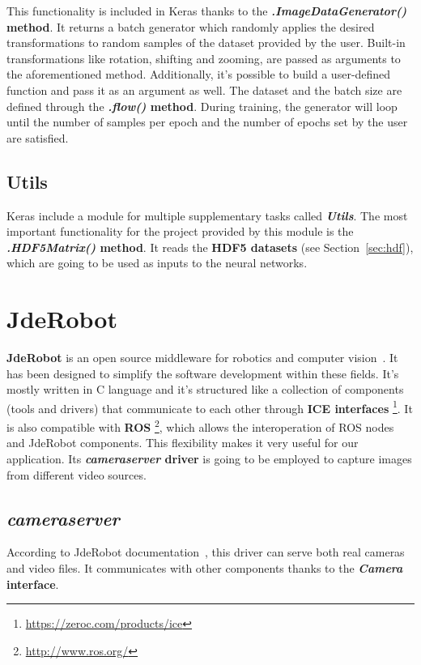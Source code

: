 This functionality is included in Keras thanks to the \textbf{\textit{.ImageDataGenerator()} method}. It returns a batch generator which randomly applies the desired transformations to random samples of the dataset provided by the user. Built-in transformations like rotation, shifting and zooming, are passed as arguments to the aforementioned method. Additionally, it's possible to build a user-defined function and pass it as an argument as well. The dataset and the batch size are defined through the \textbf{\textit{.flow()} method}. During training, the generator will loop until the number of samples per epoch and the number of epochs set by the user are satisfied.

\subsection{Utils}
Keras include a module for multiple supplementary tasks called \textbf{\textit{Utils}}. The most important functionality for the project provided by this module is the \textbf{\textit{.HDF5Matrix()} method}. It reads the \textbf{HDF5 datasets} (see Section~\ref{sec:hdf}), which are going to be used as inputs to the neural networks.

\section{JdeRobot}\label{sec:jderobot}
\textbf{JdeRobot} is an open source middleware for robotics and computer vision~\cite{jderobot}. It has been designed to simplify the software development within these fields. It's mostly written in C\nolinebreak[4]\hspace{-.05em}\raisebox{.4ex}{\tiny\bf ++} language and it's structured like a collection of components (tools and drivers) that communicate to each other through \textbf{ICE interfaces} \footnote{\url{https://zeroc.com/products/ice}}. It is also compatible with \textbf{ROS} \footnote{\url{http://www.ros.org/}}, which allows the interoperation of ROS nodes and JdeRobot components. This flexibility makes it very useful for our application.
Its \textbf{\textit{cameraserver} driver} is going to be employed to capture images from different video sources.

\subsection*{\textit{cameraserver}}
According to JdeRobot documentation~\cite{jderobot}, this driver can serve both real cameras and video files. It communicates with other components thanks to the \textbf{\textit{Camera} interface}.

